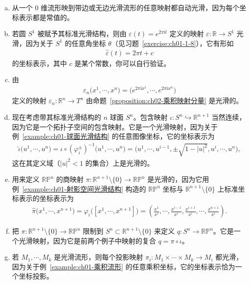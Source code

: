 \documentclass[../../main.tex]{subfiles}
\begin{document}
\begin{example}[光滑映射]\label{example:ch02-光滑映射}
\begin{enumerate}[(a)]
\item 从一个 $0$ 维流形映到带边或无边光滑流形的任意映射都自动光滑，因为每个坐标表示都是常值的。
\item 若圆 $S^{1}$ 被赋予其标准光滑结构，则由 $\varepsilon(t)=e^{2\pi\mathrm{i}t}$ 定义的映射 $\varepsilon:\mathbb{R}\to S^{1}$ 光滑，因为关于 $S^{1}$ 的任意角坐标 $\theta$（见习题~\cref{exercise:ch01-1-8}），它有形如
\begin{align*}
\widehat{\varepsilon}(t)=2\pi t+c
\end{align*}
的坐标表示，其中 $c$ 是某个常数，你可以自行验证。
\item 由
\begin{align*}
\varepsilon_{n}\bigl(x^{1},\cdots ,x^{n}\bigr)=\bigl(e^{2\pi\mathrm{i}x^{1}},\cdots ,e^{2\pi\mathrm{i}x^{n}}\bigr)
\end{align*}
定义的映射 $\varepsilon_{n}:\mathbb{R}^{n}\to T^{n}$ 由命题~\cref{proposition:ch02-乘积映射分量} 是光滑的。
\item 现在考虑带其标准光滑结构的 $n$ 球面 $S^{n}$。包含映射 $\iota:S^{n}\hookrightarrow\mathbb{R}^{n+1}$ 当然连续，因为它是一个拓扑子空间的包含映射。它是一个光滑映射，因为关于例~\cref{example:ch01-球面光滑结构} 的任意图像坐标，它的坐标表示为
\begin{align*}
\widehat{\iota}\bigl(u^{1},\cdots ,u^{n}\bigr)=\iota\circ(\varphi_{i}^{\pm})^{-1}\bigl(u^{1},\cdots ,u^{n}\bigr)
=\bigl(u^{1},\cdots ,u^{i-1},\pm\sqrt{1-|u|^{2}},u^{i},\cdots ,u^{n}\bigr),
\end{align*}
这在其定义域（$|u|^{2}<1$ 的集合）上是光滑的。
\item 用来定义 $\mathbb{RP}^{n}$ 的商映射 $\pi:\mathbb{R}^{n+1}\setminus\{0\}\to\mathbb{RP}^{n}$ 是光滑的，因为它用例~\cref{example:ch01-射影空间光滑结构} 构造的 $\mathbb{RP}^{n}$ 坐标与 $\mathbb{R}^{n+1}\setminus\{0\}$ 上标准坐标表示的坐标表示为
\begin{align*}
\widehat{\pi}\bigl(x^{1},\cdots ,x^{n+1}\bigr)=\varphi_{i}\bigl([x^{1},\cdots ,x^{n+1}]\bigr)
=\left(\frac{x^{1}}{x^{i}},\cdots ,\frac{x^{i-1}}{x^{i}},\frac{x^{i+1}}{x^{i}},\cdots ,\frac{x^{n+1}}{x^{i}}\right).
\end{align*}
\item 把 $\pi:\mathbb{R}^{n+1}\setminus\{0\}\to\mathbb{RP}^{n}$ 限制到 $S^{n}\subset\mathbb{R}^{n+1}\setminus\{0\}$ 来定义 $q:S^{n}\to\mathbb{RP}^{n}$。它是一个光滑映射，因为它是前两个例子中映射的复合 $q=\pi\circ\iota$。
\item 若 $M_{1},\cdots ,M_{k}$ 是光滑流形，则每个投影映射 $\pi_{i}:M_{1}\times\cdots\times M_{k}\to M_{i}$ 都光滑，因为关于例~\cref{example:ch01-乘积流形} 的任意乘积坐标，它的坐标表示恰为一个坐标投影。
\end{enumerate}
\end{example}
\end{document}
